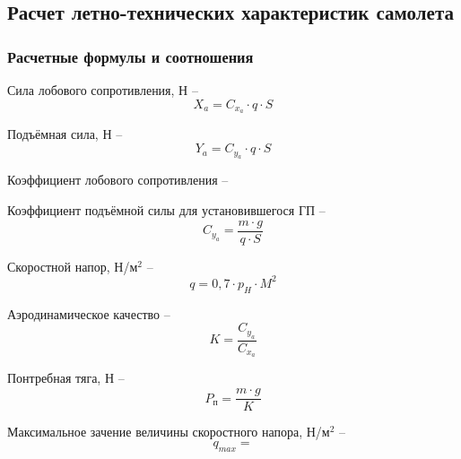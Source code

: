 \subsection{Расчет летно-технических характеристик самолета}
\label{sec:Расчет летно-технических характеристик самолета}
\subsubsection{Расчетные формулы и соотношения}

Сила лобового сопротивления, Н -- 
\begin{equation}
    \label{eq:Сила лобового сопротивления}
    X_a = C_{x_a} \cdot q \cdot S
\end{equation}

Подъёмная сила, Н -- 
\begin{equation}
    \label{eq:Подъёмная сила}
    Y_a = C_{y_a} \cdot q \cdot S
\end{equation}

Коэффициент лобового сопротивления -- 
\begin{equation}
    \label{eq:коэффициент лобового сопротивления}
\end{equation}

Коэффициент подъёмной силы для установившегося ГП -- 
\begin{equation}
    \label{eq:Коэффициент подъёмной силы для установившегося ГП}
    C_{y_a} = \frac{m \cdot g}{q \cdot S}
\end{equation}

Скоростной напор, Н/м$^2$ -- 
\begin{equation}
    \label{eq:Скоростной напор}
    q = 0,7 \cdot p_H \cdot M^2
\end{equation}

Аэродинамическое качество -- 
\begin{equation}
    \label{eq:Аэродинамическое качество}
    K = \frac{C_{y_a}}{C_{x_a}}
\end{equation}

Понтребная тяга, Н -- 
\begin{equation}
    \label{eq:Понтребная тяга}
    P_\text{п} = \frac{m \cdot g}{K}
\end{equation}

Максимальное зачение величины скоростного напора, Н/м$^2$ --
\begin{equation}
    \label{eq:Максимальное зачение величины скоростного напора}
    q_{max} = 
\end{equation}

